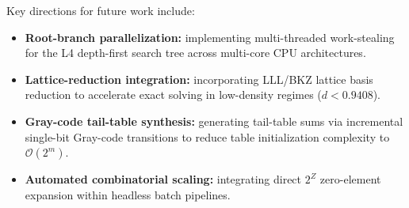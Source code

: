 \documentclass[journal,onecolumn,11pt]{IEEEtran}
\begin{document}
Key directions for future work include:
\begin{itemize}
    \item \textbf{Root-branch parallelization:} implementing multi-threaded work-stealing for the L4 depth-first search tree across multi-core CPU architectures.
    \item \textbf{Lattice-reduction integration:} incorporating LLL/BKZ lattice basis reduction to accelerate exact solving in low-density regimes ($d < 0.9408$).
    \item \textbf{Gray-code tail-table synthesis:} generating tail-table sums via incremental single-bit Gray-code transitions to reduce table initialization complexity to $\mathcal{O}(2^m)$.
    \item \textbf{Automated combinatorial scaling:} integrating direct $2^Z$ zero-element expansion within headless batch pipelines.
\end{itemize}



\end{document}
